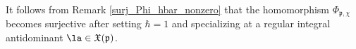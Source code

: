 \documentclass[12pt]{amsart}
\begin{document}
It follows from Remark \ref{surj_Phi_hbar_nonzero} that the homomorphism $\Phi_{\mathfrak{p},\chi}$ becomes surjective after setting $\hbar=1$ and specializing at a regular integral antidominant $\la \in \mathfrak{X}(\mathfrak{p})$. 








\end{document}

